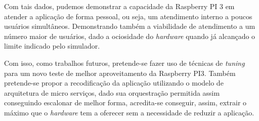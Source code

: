 \documentclass[12pt,english,brazil]{article}
\begin{document}
Com tais dados, pudemos demonstrar a capacidade da Raspberry PI 3 em atender a aplicação de forma pessoal, ou seja, um atendimento interno a poucos usuários simultâneos. Demonstrando também a viabilidade de atendimento a um número maior de usuários, dado a ociosidade do \emph{hardware} quando já alcançado o limite indicado pelo simulador.

Com isso, como trabalhos futuros, pretende-se fazer uso de técnicas de \emph{tuning} para um novo teste de melhor aproveitamento da Raspberry PI3. Também pretende-se propor a recodificação da aplicação utilizando o modelo de arquitetura de micro serviços, dado sua orquestração permitida assim conseguindo escalonar de melhor forma, acredita-se conseguir, assim, extrair o máximo que o \emph{hardware} tem a oferecer sem a necessidade de reduzir a aplicação. 




\label{fimdotexto}
\end{document}
